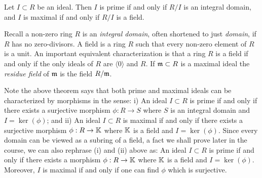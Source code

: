 \documentclass[12pt,reqno]{amsart}
\begin{document}
\begin{theorem}
Let $I \subset R$ be an ideal. Then $I$ is prime if and only if $R/I$ is an integral domain, and $I$ is maximal if and only if $R/I$ is a field.
\end{theorem}

Recall a non-zero ring $R$ is an \emph{integral domain}, often shortened to just \emph{domain}, if $R$ has no zero-divisors. A field is a ring $R$ such that every non-zero element of $R$ is a unit. An important equivalent characterization is that a ring $R$ is a field if and only if the only ideals of $R$ are $\langle 0\rangle$ and $R$. If $\mathfrak{m} \subset R$ is a maximal ideal the \emph{residue field} of $\mathfrak{m}$ is the field $R/\mathfrak{m}$. 

Note the above theorem says that both prime and maximal ideals can be characterized by morphisms in the sense: i) An ideal $I \subset R$ is prime if and only if there exists a surjective morphism $\phi:R \to S$ where $S$ is an integral domain and  $I=\ker(\phi)$; and ii) An ideal $I \subset R$ is maximal if and only if there exists a surjective morphism $\phi:R \to \mathbb{K}$ where $\mathbb{K}$ is a field and $I = \ker(\phi)$. Since every domain can be viewed as a subring of a field, a fact we shall prove later in the course, we can also rephrase (i) and (ii) above as: An ideal $I \subset R$ is prime if and only if there exists a morphism $\phi:R \to \mathbb{K}$ where $\mathbb{K}$ is a field and $I=\ker(\phi)$. Moreover, $I$ is maximal if and only if one can find $\phi$ which is surjective. 


 \hrulefill 
 
\end{document}
